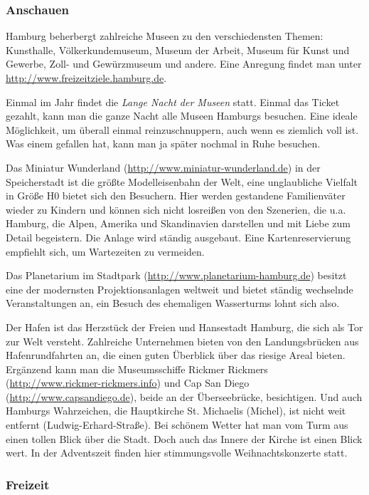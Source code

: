 \subsubsection{Anschauen}

Hamburg beherbergt zahlreiche Museen zu den verschiedensten Themen: Kunsthalle,
Völkerkundemuseum, Museum der Arbeit, Museum für Kunst und Gewerbe, Zoll- und
Gewürzmuseum und andere. Eine Anregung findet man unter
\url{http://www.freizeitziele.hamburg.de}.

\begin{advice}
Einmal im Jahr findet die \emph{Lange Nacht der Museen} statt. Einmal das
Ticket gezahlt, kann man die ganze Nacht alle Museen Hamburgs besuchen. Eine
ideale Möglichkeit, um überall einmal reinzuschnuppern, auch wenn es ziemlich
voll ist. Was einem gefallen hat, kann man ja später nochmal in Ruhe besuchen.
\end{advice}

Das Miniatur Wunderland (\url{http://www.miniatur-wunderland.de}) in der
Speicherstadt ist die größte Modelleisenbahn der Welt, eine unglaubliche
Vielfalt in Größe H0 bietet sich den Besuchern. Hier werden gestandene
Familienväter wieder zu Kindern und können sich nicht losreißen von den
Szenerien, die u.a. Hamburg, die Alpen, Amerika und Skandinavien darstellen und
mit Liebe zum Detail begeistern. Die Anlage wird ständig ausgebaut. Eine
Kartenreservierung empfiehlt sich, um Wartezeiten zu vermeiden.

Das Planetarium im Stadtpark (\url{http://www.planetarium-hamburg.de}) besitzt
eine der modernsten Projektionsanlagen weltweit und bietet ständig wechselnde
Veranstaltungen an, ein Besuch des ehemaligen Wasserturms lohnt sich also.

Der Hafen ist das Herzstück der Freien und Hansestadt Hamburg, die sich als Tor
zur Welt versteht. Zahlreiche Unternehmen bieten von den Landungsbrücken aus
Hafenrundfahrten an, die einen guten Überblick über das riesige Areal bieten.
Ergänzend kann man die Museumsschiffe Rickmer Rickmers
(\url{http://www.rickmer-rickmers.info}) und Cap San Diego
(\url{http://www.capsandiego.de}), beide an der Überseebrücke, besichtigen. Und
auch Hamburgs Wahrzeichen, die Hauptkirche St. Michaelis (Michel), ist nicht
weit entfernt (Ludwig-Erhard-Straße). Bei schönem Wetter hat man vom Turm aus
einen tollen Blick über die Stadt. Doch auch das Innere der Kirche ist einen
Blick wert. In der Adventszeit finden hier stimmungsvolle Weihnachtskonzerte
statt.

\subsubsection{Freizeit}

